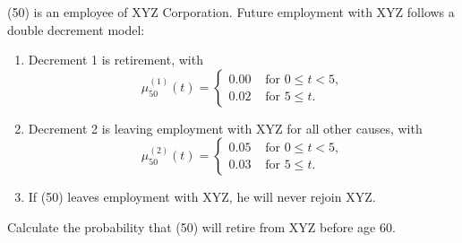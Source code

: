  (50) is an employee of XYZ Corporation. Future employment with XYZ follows 
a double decrement model:
\begin{enumerate}
\item Decrement 1 is retirement, with 
  \[ \mu_{50}^{(1)}(t)=\left\{\begin{array}{ll}
     0.00 & \mbox{ for }0\leq t < 5, \\
     0.02 & \mbox{ for }5\leq t.
  \end{array}\right. \]
\item Decrement 2 is leaving employment with XYZ for all other causes, with
  \[ \mu_{50}^{(2)}(t)=\left\{\begin{array}{ll}
     0.05 & \mbox{ for }0\leq t < 5, \\
     0.03 & \mbox{ for }5\leq t.
  \end{array}\right. \]
\item If (50) leaves employment with XYZ, he will never rejoin XYZ.
\end{enumerate}
Calculate the probability that (50) will retire from XYZ before age 60.
\showsol{}
